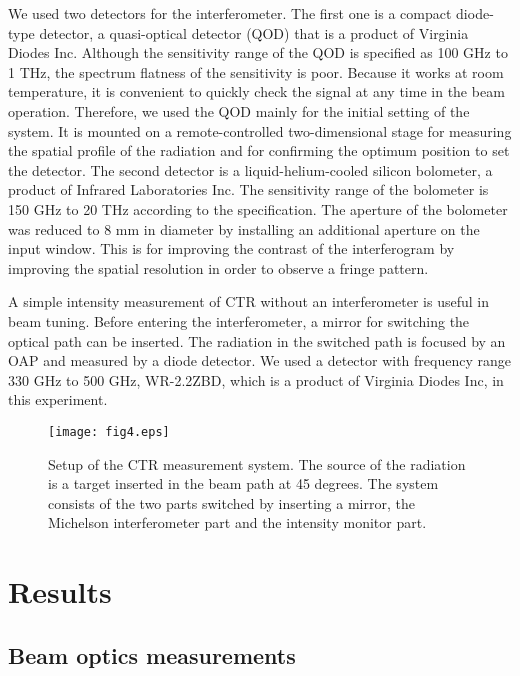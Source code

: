 \documentclass[review]{elsarticle}
\begin{document}
We used two detectors for the interferometer.
The first one is a compact diode-type detector,
a quasi-optical detector (QOD) that is a product of Virginia Diodes Inc.
Although the sensitivity range of the QOD is specified as 100 GHz to 1 THz,
the spectrum flatness of the sensitivity is poor.
Because it works at room temperature,
it is convenient to quickly check the signal at any time in the beam operation.
Therefore, we used the QOD mainly for the initial setting of the system.
It is mounted on a remote-controlled two-dimensional stage 
for measuring the spatial profile of the radiation 
and for confirming the optimum position to set the detector.
The second detector is a liquid-helium-cooled silicon bolometer,
a product of Infrared Laboratories Inc.
The sensitivity range of the bolometer is 150 GHz to 20 THz 
according to the specification.
The aperture of the bolometer was reduced to 8 mm in diameter
by installing an additional aperture on the input window.
This is for improving the contrast of the interferogram
by improving the spatial resolution in order to observe a fringe pattern.


A simple intensity measurement of CTR 
without an interferometer is useful in beam tuning.
Before entering the interferometer,
a mirror for switching the optical path can be inserted.
The radiation in the switched path is focused by an OAP
and measured by a diode detector.
We used a detector with frequency range 330 GHz to 500 GHz,
WR-2.2ZBD, which is a product of Virginia Diodes Inc,
in this experiment.



\begin{figure}[htb]
	\begin{center}
	 \texttt{[image: fig4.eps]}
	  \caption{
Setup of the CTR measurement system.
The source of the radiation is a target inserted in the beam path at 45 degrees.
The system consists of the 
two parts switched by inserting a mirror,
the Michelson interferometer part
and the intensity monitor part. 
}
	\label{fig:setup_interferometer}
\end{center}
\end{figure}


\section{Results}

\subsection{Beam optics measurements}
\end{document}
